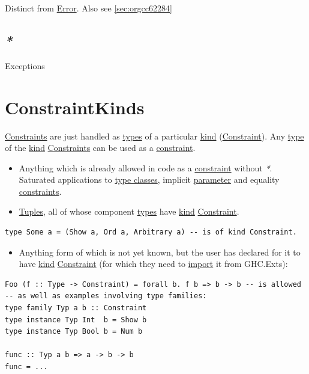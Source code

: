 \documentclass[a4paper,14pt,oneside]{book}
\begin{document}
Distinct from \hyperref[org7b513aa]{Error}. Also see \ref{sec:orgcc62284}

\section{\emph{*}}
\label{sec:orgc785dd3}

\label{orgde70cef}Exceptions

\chapter{\label{orgdd53ed0}ConstraintKinds}
\label{sec:orgcb4d39e}
\hyperref[orgdc75c33]{Constraints} are just handled as \hyperref[org1a5322f]{types} of a particular \hyperref[org5d1059f]{kind} (\hyperref[org4bea0ab]{Constraint}).
Any \hyperref[orgfdd3557]{type} of the \hyperref[org5d1059f]{kind} \hyperref[orgdc75c33]{Constraints} can be used as a \hyperref[org4bea0ab]{constraint}.
\begin{itemize}
\item Anything which is already allowed in code as a \hyperref[org4bea0ab]{constraint} without \emph{*}. Saturated applications to \hyperref[orgb24041a]{type classes}, implicit \hyperref[org586036f]{parameter} and equality \hyperref[orgdc75c33]{constraints}.
\item \hyperref[org3444235]{Tuples}, all of whose component \hyperref[org1a5322f]{types} have \hyperref[org5d1059f]{kind} \hyperref[org4bea0ab]{Constraint}.
\end{itemize}
\begin{verbatim}
type Some a = (Show a, Ord a, Arbitrary a) -- is of kind Constraint.
\end{verbatim}
\begin{itemize}
\item Anything form of which is not yet known, but the user has declared for it to have \hyperref[org5d1059f]{kind} \hyperref[org4bea0ab]{Constraint} (for which they need to \hyperref[orge8d7a5a]{import} it from GHC.Exts):
\end{itemize}
\begin{verbatim}
Foo (f :: Type -> Constraint) = forall b. f b => b -> b -- is allowed
-- as well as examples involving type families:
type family Typ a b :: Constraint
type instance Typ Int  b = Show b
type instance Typ Bool b = Num b

func :: Typ a b => a -> b -> b
func = ...
\end{verbatim}
\end{document}
